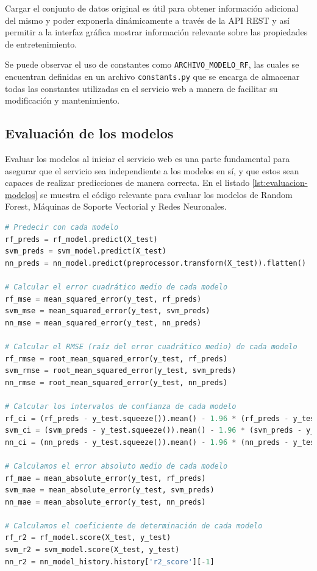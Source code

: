 Cargar el conjunto de datos original es útil para obtener información adicional
del mismo y poder exponerla dinámicamente a través de la API REST y así permitir
a la interfaz gráfica mostrar información relevante sobre las propiedades de
entretenimiento.

Se puede observar el uso de constantes como \texttt{ARCHIVO\_MODELO\_RF},
las cuales se encuentran definidas en un archivo \texttt{constants.py} que se
encarga de almacenar todas las constantes utilizadas en el servicio web a manera
de facilitar su modificación y mantenimiento.

\subsection{Evaluación de los modelos}
Evaluar los modelos al iniciar el servicio web es una parte fundamental para
asegurar que el servicio sea independiente a los modelos en sí, y que estos
sean capaces de realizar predicciones de manera correcta. En el listado
\ref{lst:evaluacion-modelos} se muestra el código relevante para evaluar los
modelos de Random Forest, Máquinas de Soporte Vectorial y Redes Neuronales.

\begin{lstlisting}[language=python, caption={Evaluación de los modelos}, label={lst:evaluacion-modelos}]
# Predecir con cada modelo
rf_preds = rf_model.predict(X_test)
svm_preds = svm_model.predict(X_test)
nn_preds = nn_model.predict(preprocessor.transform(X_test)).flatten()

# Calcular el error cuadrático medio de cada modelo
rf_mse = mean_squared_error(y_test, rf_preds)
svm_mse = mean_squared_error(y_test, svm_preds)
nn_mse = mean_squared_error(y_test, nn_preds)

# Calcular el RMSE (raíz del error cuadrático medio) de cada modelo
rf_rmse = root_mean_squared_error(y_test, rf_preds)
svm_rmse = root_mean_squared_error(y_test, svm_preds)
nn_rmse = root_mean_squared_error(y_test, nn_preds)

# Calcular los intervalos de confianza de cada modelo
rf_ci = (rf_preds - y_test.squeeze()).mean() - 1.96 * (rf_preds - y_test.squeeze()).std(), (rf_preds - y_test.squeeze()).mean() + 1.96 * (rf_preds - y_test.squeeze()).std()
svm_ci = (svm_preds - y_test.squeeze()).mean() - 1.96 * (svm_preds - y_test.squeeze()).std(), (svm_preds - y_test.squeeze()).mean() + 1.96 * (svm_preds - y_test.squeeze()).std()
nn_ci = (nn_preds - y_test.squeeze()).mean() - 1.96 * (nn_preds - y_test.squeeze()).std(), (nn_preds - y_test.squeeze()).mean() + 1.96 * (nn_preds - y_test.squeeze()).std()

# Calculamos el error absoluto medio de cada modelo
rf_mae = mean_absolute_error(y_test, rf_preds)
svm_mae = mean_absolute_error(y_test, svm_preds)
nn_mae = mean_absolute_error(y_test, nn_preds)

# Calculamos el coeficiente de determinación de cada modelo
rf_r2 = rf_model.score(X_test, y_test)
svm_r2 = svm_model.score(X_test, y_test)
nn_r2 = nn_model_history.history['r2_score'][-1]
\end{lstlisting}

